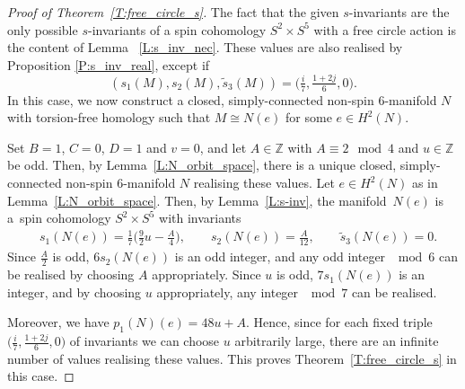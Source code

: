 \documentclass[10pt,a4paper]{amsart}
\numberwithin{equation}{section}
\theoremstyle{definition}
\numberwithin{table}{section}
\newcommand{\Z}{\mathbb{Z}}
\begin{document}
\begin{proof}[Proof of Theorem~\ref{T:free_circle_s}]
	The fact that the given $s$-invariants are the only possible $s$-invariants of a spin cohomology $S^2\times S^5$ with a free circle action is the content of Lemma~ \ref{L:s_inv_nec}. These values are also realised by Proposition \ref{P:s_inv_real}, except if
	\[ (s_1(M),s_2(M),\tilde{s}_3(M))=\bigl( \tfrac{i}{7},\tfrac{1+2j}{6},0 \bigr). \]
	In this case, we now construct a closed, simply-connected non-spin $6$-manifold $N$ with torsion-free homology such that $M\cong N(e)$ for some $e\in H^2(N)$.
	
	Set $B=1$, $C=0$, $D=1$ and $v=0$, and let $A\in\Z$ with $A\equiv 2\mod4$ and $u\in\Z$ be odd. Then, by Lemma~\ref{L:N_orbit_space}, there is a unique closed, simply-connected non-spin $6$-manifold $N$ realising these values. Let $e\in H^2(N)$ as in Lemma~\ref{L:N_orbit_space}. Then, by Lemma~\ref{L:s-inv}, the manifold~$N(e)$ is a~spin cohomology $S^2\times S^5$ with invariants
	\begin{align*}
		&s_1(N(e))=\frac{1}{7}\biggl( \frac{9}{2}u-\frac{A}{4} \biggr),\qquad
		s_2(N(e))=\frac{A}{12},\qquad
		\tilde{s}_3(N(e))=0.
	\end{align*}
	Since $\frac{A}{2}$ is odd, $6s_2(N(e))$ is an odd integer, and any odd integer $\mod6$ can be realised by choosing $A$ appropriately. Since $u$ is odd, $7s_1(N(e))$ is an integer, and by choosing $u$ appropriately, any integer $\mod7$ can be realised.
	
	Moreover, we have $p_1(N)(e)=48u+A$. Hence, since for each fixed triple $\bigl(\tfrac{i}{7},\frac{1+2j}{6},0\bigr)$ of invariants we can choose $u$ arbitrarily large, there are an infinite number of values realising these values. This proves Theorem~\ref{T:free_circle_s} in this case.
	

\end{proof}
\end{document}
